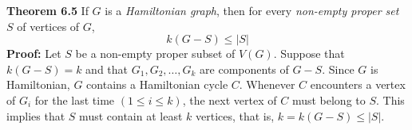 \nopagenumbers
{\bf Theorem 6.5}
\vskip 6pt
If $G$ is a {\it Hamiltonian graph}, then for every {\it non-empty proper set} $S$ of vertices of $G$, $$k(G-S) \leq |S|$$
\vskip 10pt
{\bf Proof:}
\vskip 6pt
Let $S$ be a non-empty proper subset of $V(G)$. Suppose that $k(G-S)=k$ and that $G_1,G_2, \ldots ,G_k$ are components of $G-S$.
Since $G$ is Hamiltonian, $G$ contains a Hamiltonian cycle $C$. Whenever $C$ encounters a vertex of $G_i$ for the last time $(1 \leq i \leq k)$, the next vertex
of $C$ must belong to $S$. This implies that $S$ must contain at least $k$ vertices, that is, $k=k(G-S) \leq |S|$.
\vfill\eject
